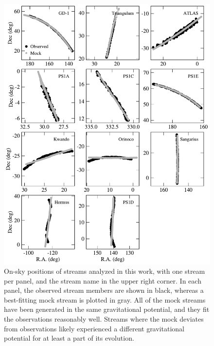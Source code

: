 \documentclass[modern]{aastex61}
\begin{document}
\begin{figure}
\begin{center}
\includegraphics[width=\textwidth]{mocks.pdf}
\caption{On-sky positions of streams analyzed in this work, with one stream per panel, and the stream name in the upper right corner.
In each panel, the observed stream members are shown in black, whereas a best-fitting mock stream is plotted in gray.
All of the mock streams have been generated in the same gravitational potential, and they fit the observations reasonably well.
Streams where the mock deviates from observations likely experienced a different gravitational potential for at least a part of its evolution.
}
\label{fig:gallery}
\end{center}
\end{figure}
\end{document}
